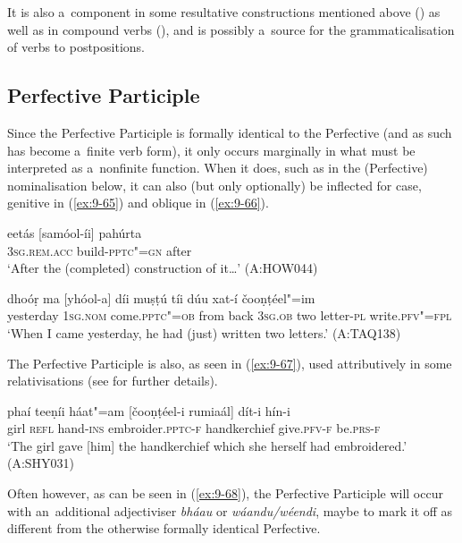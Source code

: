 It is also a~component in some resultative constructions mentioned above () as well as in compound verbs (), and is possibly a~source for the grammaticalisation of verbs to postpositions.


\subsection{Perfective Participle}
\label{subsec:9-3-2}


Since the Perfective Participle is formally identical to the Perfective (and as such has become a~finite verb form), it only occurs marginally in what must be interpreted as a~nonfinite function. When it does, such as in the (Perfective) nominalisation below, it can also (but only optionally) be inflected for case, genitive in (\ref{ex:9-65}) and oblique in (\ref{ex:9-66}).

\begin{exe}
\ex
\label{ex:9-65}
\gll eetás [samóol-íi] pahúrta \\
\textsc{3sg.rem.acc} build-\textsc{pptc"=gn} after \\
\glt `After the (completed) construction of it{\ldots}' (A:HOW044)

\ex
\label{ex:9-66}
\gll dhoóṛ ma [yhóol-a] díi muṣṭú tíi dúu xat-í čooṇṭéel"=im \\
yesterday 1\textsc{sg.nom} come.\textsc{pptc"=ob} from back \textsc{3sg.ob} two letter-\textsc{pl} write.\textsc{pfv"=fpl} \\
\glt `When I came yesterday, he had (just) written two letters.' (A:TAQ138)
\end{exe}

The Perfective Participle is also, as seen in (\ref{ex:9-67}), used attributively in some relativisations (see  for further details).

\begin{exe}
\ex
\label{ex:9-67}
\gll phaí teeṇíi háat"=am [čooṇṭéel-i rumiaál] dít-i hín-i \\
girl \textsc{refl} hand-\textsc{ins} embroider.\textsc{pptc-f} handkerchief give.\textsc{pfv-f} be.\textsc{prs-f} \\
\glt `The girl gave [him] the handkerchief which she herself had embroidered.' (A:SHY031)
\end{exe}

Often however, as can be seen in (\ref{ex:9-68}), the Perfective Participle will occur with an~additional adjectiviser \textit{bháau} or \textit{wáandu/wéendi}, maybe to mark it off as different from the otherwise formally identical Perfective.

